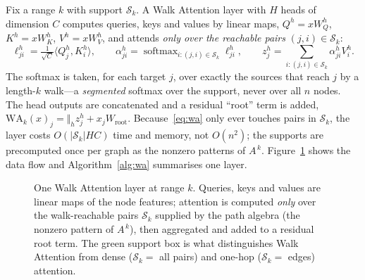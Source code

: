 \documentclass[runningheads]{llncs}
\newcommand{\Adj}{A}
\DeclareMathOperator{\softmax}{softmax}
\begin{document}
Fix a range $k$ with support $\mathcal{S}_k$. A Walk Attention layer with $H$
heads of dimension $C$ computes queries, keys and values by linear maps,
$Q^h=xW^h_Q$, $K^h=xW^h_K$, $V^h=xW^h_V$, and attends \emph{only over the
reachable pairs} $(j,i)\in\mathcal{S}_k$:
\begin{equation}\label{eq:wa}
  \ell^h_{ji} = \tfrac{1}{\sqrt{C}}\langle Q^h_j,K^h_i\rangle,\qquad
  \alpha^h_{ji} = \softmax_{i:(j,i)\in\mathcal{S}_k}\ell^h_{ji},\qquad
  z^h_j = \textstyle\sum_{i:(j,i)\in\mathcal{S}_k}\alpha^h_{ji}V^h_i.
\end{equation}
The softmax is taken, for each target $j$, over exactly the sources that reach
$j$ by a length-$k$ walk---a \emph{segmented} softmax over the support, never
over all $n$ nodes. The head outputs are concatenated and a residual ``root''
term is added, $\mathrm{WA}_k(x)_j=\Vert_h z^h_j + x_jW_{\!\text{root}}$.
Because~\eqref{eq:wa} only ever touches pairs in $\mathcal{S}_k$, the layer
costs $O(|\mathcal{S}_k|HC)$ time and memory, not $O(n^2)$; the supports are
precomputed once per graph as the nonzero patterns of $\Adj^{\,k}$.
Figure~\ref{fig:layer} shows the data flow and Algorithm~\ref{alg:wa}
summarises one layer.

\begin{figure}[t]
\centering
{}
\caption{One Walk Attention layer at range $k$. Queries, keys and values are
linear maps of the node features; attention is computed \emph{only} over the
walk-reachable pairs $\mathcal{S}_k$ supplied by the path algebra (the nonzero
pattern of $\Adj^{\,k}$), then aggregated and added to a residual root term.
The green support box is what distinguishes Walk Attention from dense
($\mathcal{S}_k=$ all pairs) and one-hop ($\mathcal{S}_k=$ edges) attention.}
\label{fig:layer}
\end{figure}
\end{document}
